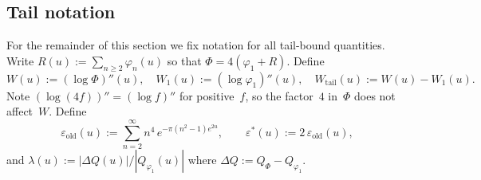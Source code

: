 \documentclass[11pt]{article}
\theoremstyle{definition}
\theoremstyle{remark}
\begin{document}
\subsection*{Tail notation}

For the remainder of this section we fix notation for all tail-bound quantities.
Write $R(u) := \sum_{n \geq 2} \varphi_n(u)$ so that $\Phi = 4(\varphi_1 + R)$.
Define
\[
W(u) := (\log\Phi)''(u),\quad W_1(u) := (\log\varphi_1)''(u),\quad
W_{\mathrm{tail}}(u) := W(u) - W_1(u).
\]
Note $(\log(4f))'' = (\log f)''$ for positive~$f$, so the factor~$4$ in~$\Phi$ does not affect~$W$.
Define
\[
\varepsilon_{\mathrm{old}}(u) := \sum_{n=2}^{\infty} n^4\,e^{-\pi(n^2-1)e^{2u}},
\qquad
\varepsilon^*(u) := 2\,\varepsilon_{\mathrm{old}}(u),
\]
and $\lambda(u) := |\Delta Q(u)|/|Q_{\varphi_1}(u)|$ where $\Delta Q := Q_\Phi - Q_{\varphi_1}$.
\end{document}
